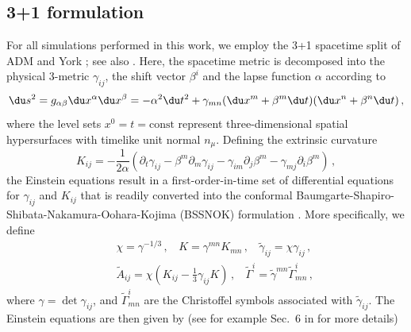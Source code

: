 \subsection{3+1 formulation}
%
For all simulations performed in this work, we employ the
3+1 spacetime split of ADM \cite{Arnowitt:1962hi} and York \cite{York1979}; see also
\cite{Gourgoulhon:2007ue}. Here, the spacetime metric is
decomposed into the physical 3-metric $\gamma_{ij}$, the
shift vector $\beta^i$ and the lapse function $\alpha$ according to
%
\begin{equation}
  \du s^2 = g_{\alpha\beta}\du x^{\alpha}\du x^{\beta}
  = -\alpha^2 \du t^2 + \gamma_{mn}(\du x^m+\beta^m \du t)
  (\du x^n + \beta^n \du t)\,,
\end{equation}
%
where the level sets $x^0=t=\mathrm{const}$ represent three-dimensional
spatial hypersurfaces with timelike unit normal $n_{\mu}$.
Defining the extrinsic curvature
%
\begin{equation}
  K_{ij} = -\frac{1}{2\alpha}(\partial_t \gamma_{ij}
  -\beta^m\partial_m \gamma_{ij} -\gamma_{im}\partial_j
  \beta^m-\gamma_{mj}\partial_i \beta^m)\,,
  \label{mal:eq:Kij}
\end{equation}
%
the Einstein equations result in a first-order-in-time
set of differential equations for $\gamma_{ij}$ and $K_{ij}$
that is readily converted into the conformal
Baumgarte-Shapiro-Shibata-Nakamura-Oohara-Kojima (BSSNOK)
formulation
\cite{Baumgarte:1998te,Shibata:1995we,Nakamura:1987zz}.
More specifically, we define
%
\begin{eqnarray}
  &&\chi = \gamma^{-1/3}\,,~~~~
  K=\gamma^{mn}K_{mn}\,,~~~~
  \tilde{\gamma}_{ij}=\chi \gamma_{ij}\,, \nonumber \\
  &&
  \tilde{A}_{ij}=\chi\left(K_{ij}-\frac{1}{3}\gamma_{ij}K\right)\,,~~~~
  \tilde{\Gamma}^i=\tilde{\gamma}^{mn}\tilde{\Gamma}^i_{mn}\,,
\end{eqnarray}
%
where $\gamma=\det \gamma_{ij}$, and $\tilde{\Gamma}^i_{mn}$
are the Christoffel symbols associated with $\tilde{\gamma}_{ij}$.
The Einstein equations are then given by (see for example
Sec.~6 in \cite{Cardoso:2014uka} for more details)
%
